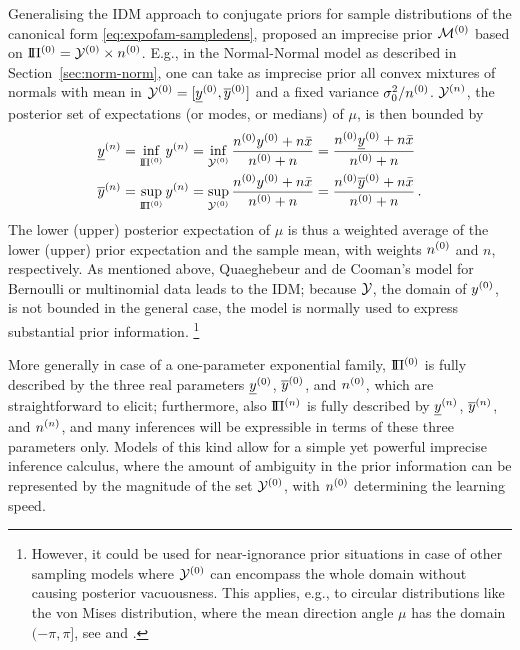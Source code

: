 Generalising the IDM approach to conjugate priors for sample distributions of the canonical form \eqref{eq:expofam-sampledens},
\textcite{2005:quaeghebeurcooman} proposed an imprecise prior $\mathcal{M}^{(0)}$ based on $\text{I}\!\Pi^{(0)} = \mathcal{Y}^{(0)} \times n^{(0)}$.
E.g., in the Normal-Normal model as described in Section~\ref{sec:norm-norm},
one can take as imprecise prior all convex mixtures of normals with mean in $\mathcal{Y}^{(0)} = [\underline{y}^{(0)}, \overline{y}^{(0)}]$ and a fixed variance $\sigma_0^2/n^{(0)}$.
$\mathcal{Y}^{(n)}$, the posterior set of expectations (or modes, or medians) of $\mu$, is then bounded by
\begin{align}
\label{eq:qdc-ynl}
\underline{y}^{(n)} &= \inf_{\text{I}\!\Pi^{(0)}} y^{(n)} = \inf_{\mathcal{Y}^{(0)}} \frac{n^{(0)}y^{(0)} + n\bar{x}}{n^{(0)} + n} = \frac{n^{(0)}\underline{y}^{(0)} + n\bar{x}}{n^{(0)} + n}\\
\label{eq:qdc-ynu}
\overline{y}^{(n)} &= \sup_{\text{I}\!\Pi^{(0)}} y^{(n)} = \sup_{\mathcal{Y}^{(0)}} \frac{n^{(0)}y^{(0)} + n\bar{x}}{n^{(0)} + n} = \frac{n^{(0)}\overline{y}^{(0)} + n\bar{x}}{n^{(0)} + n}\,.
\end{align}
The lower (upper) posterior expectation of $\mu$ is thus a weighted average of the lower (upper) prior expectation and the sample mean,
with weights $n^{(0)}$ and $n$, respectively.
As mentioned above, Quaeghebeur and de Cooman's \parencite*{2005:quaeghebeurcooman} model for Bernoulli or multinomial data leads to the IDM;
because $\mathcal{Y}$, the domain of $y^{(0)}$, is not bounded in the general case,
the model is normally used to express substantial prior information.%
\footnote{However, it could be used for near-ignorance prior situations
in case of other sampling models where $\mathcal{Y}^{(0)}$ can encompass the whole domain without causing posterior vacuousness.
This applies, e.g., to circular distributions like the von Mises distribution,
where the mean direction angle $\mu$ has the domain $(-\pi, \pi]$,
see \textcite[\S B.1.4]{2009:quaeghebeur::phd} and \textcite{1976:mardiaelatoum}.}

More generally in case of a one-parameter exponential family,
$\text{I}\!\Pi^{(0)}$ is fully described by the three real parameters $\underline{y}^{(0)}$, $\overline{y}^{(0)}$, and $n^{(0)}$,
which are straightforward to elicit; furthermore, also $\text{I}\!\Pi^{(n)}$ is fully described by $\underline{y}^{(n)}$, $\overline{y}^{(n)}$, and $n^{(n)}$,
and many inferences will be expressible in terms of these three parameters only.
Models of this kind allow for a simple yet powerful imprecise inference calculus,
where the amount of ambiguity in the prior information can be represented by the magnitude of the set $\mathcal{Y}^{(0)}$,
with $n^{(0)}$ determining the learning speed.


